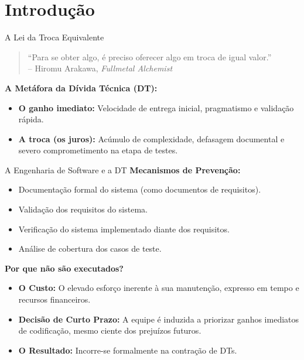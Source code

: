 \section{Introdução}

\begin{frame}{A Lei da Troca Equivalente}
  \begin{quote}
    ``Para se obter algo, é preciso oferecer algo em troca de igual valor.''\\
    \raggedleft \small -- Hiromu Arakawa, \textit{Fullmetal Alchemist}
  \end{quote}
  
  \vspace{1.5em}
  
  \textbf{A Metáfora da Dívida Técnica (DT):}
  \begin{itemize}
    \item \textbf{O ganho imediato:} Velocidade de entrega inicial, pragmatismo e validação rápida.
    \item \textbf{A troca (os juros):} Acúmulo de complexidade, defasagem documental e severo comprometimento na etapa de testes.
  \end{itemize}
\end{frame}

\begin{frame}{A Engenharia de Software e a DT}
  \textbf{Mecanismos de Prevenção:}
  \begin{itemize}
      \item Documentação formal do sistema (como documentos de requisitos).
      \item Validação dos requisitos do sistema.
      \item Verificação do sistema implementado diante dos requisitos.
      \item Análise de cobertura dos casos de teste.
  \end{itemize}

  \vspace{1em}

  \textbf{Por que não são executados?}
  \begin{itemize}
    \item \textbf{O Custo:} O elevado esforço inerente à sua manutenção, expresso em tempo e recursos financeiros.
    \item \textbf{Decisão de Curto Prazo:} A equipe é induzida a priorizar ganhos imediatos de codificação, mesmo ciente dos prejuízos futuros.
    \item \textbf{O Resultado:} Incorre-se formalmente na contração de DTs.
  \end{itemize}
  
\end{frame}

